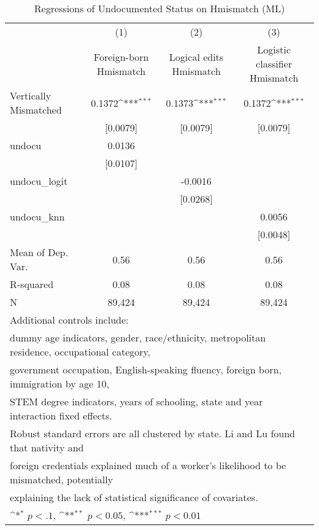 \begin{table}[htbp]\centering
\def\sym#1{\ifmmode^{#1}\else\(^{#1}\)\fi}
\caption{Regressions of Undocumented Status on Hmismatch (ML)}
\begin{tabular}{l*{3}{c}}
\toprule
                    &\multicolumn{1}{c}{(1)}         &\multicolumn{1}{c}{(2)}         &\multicolumn{1}{c}{(3)}         \\
                    &Foreign-born Hmismatch         &Logical edits Hmismatch         &Logistic classifier Hmismatch         \\
\midrule
Vertically Mismatched&      0.1372\sym{***}&      0.1373\sym{***}&      0.1372\sym{***}\\
                    &    [0.0079]         &    [0.0079]         &    [0.0079]         \\
\addlinespace
undocu              &      0.0136         &                     &                     \\
                    &    [0.0107]         &                     &                     \\
\addlinespace
undocu\_logit        &                     &     -0.0016         &                     \\
                    &                     &    [0.0268]         &                     \\
\addlinespace
undocu\_knn          &                     &                     &      0.0056         \\
                    &                     &                     &    [0.0048]         \\
\midrule
Mean of Dep. Var.   &        0.56         &        0.56         &        0.56         \\
R-squared           &        0.08         &        0.08         &        0.08         \\
N                   &      89,424         &      89,424         &      89,424         \\
\bottomrule
\multicolumn{4}{l}{\footnotesize Additional controls include:}\\
\multicolumn{4}{l}{\footnotesize dummy age indicators, gender, race/ethnicity, metropolitan residence, occupational category,}\\
\multicolumn{4}{l}{\footnotesize government occupation, English-speaking fluency, foreign born, immigration by age 10,}\\
\multicolumn{4}{l}{\footnotesize STEM degree indicators, years of schooling, state and year interaction fixed effects.}\\
\multicolumn{4}{l}{\footnotesize Robust standard errors are all clustered by state. Li and Lu found that nativity and}\\
\multicolumn{4}{l}{\footnotesize foreign credentials explained much of a worker's likelihood to be mismatched, potentially}\\
\multicolumn{4}{l}{\footnotesize explaining the lack of statistical significance of covariates.}\\
\multicolumn{4}{l}{\footnotesize \sym{*} \(p<.1\), \sym{**} \(p<0.05\), \sym{***} \(p<0.01\)}\\
\end{tabular}
\end{table}

